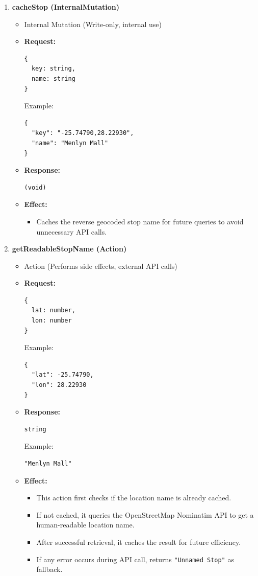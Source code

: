 \documentclass[a4paper,12pt]{article}
\begin{document}
\begin{enumerate}
  \item \textbf{cacheStop (InternalMutation)}
    \begin{itemize}
      \item Internal Mutation (Write-only, internal use)
      \item \textbf{Request:}
      \begin{verbatim}
{
  key: string,
  name: string
}
      \end{verbatim}
      Example:
      \begin{verbatim}
{
  "key": "-25.74790,28.22930",
  "name": "Menlyn Mall"
}
      \end{verbatim}
      \item \textbf{Response:}
      \begin{verbatim}
(void)
      \end{verbatim}
      \item \textbf{Effect:}
      \begin{itemize}
        \item Caches the reverse geocoded stop name for future queries to avoid unnecessary API calls.
      \end{itemize}
    \end{itemize}

  \item \textbf{getReadableStopName (Action)}
    \begin{itemize}
      \item Action (Performs side effects, external API calls)
      \item \textbf{Request:}
      \begin{verbatim}
{
  lat: number,
  lon: number
}
      \end{verbatim}
      Example:
      \begin{verbatim}
{
  "lat": -25.74790,
  "lon": 28.22930
}
      \end{verbatim}
      \item \textbf{Response:}
      \begin{verbatim}
string
      \end{verbatim}
      Example:
      \begin{verbatim}
"Menlyn Mall"
      \end{verbatim}
      \item \textbf{Effect:}
      \begin{itemize}
        \item This action first checks if the location name is already cached.
        \item If not cached, it queries the OpenStreetMap Nominatim API to get a human-readable location name.
        \item After successful retrieval, it caches the result for future efficiency.
        \item If any error occurs during API call, returns \texttt{"Unnamed Stop"} as fallback.
      \end{itemize}
    \end{itemize}

\end{enumerate}
\end{document}
